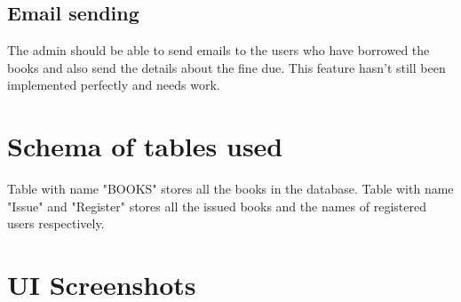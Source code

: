 \documentclass{article}
\begin{document}
\subsection{Email sending}
\large{The admin should be able to send emails to the users who have borrowed the books and also send the details about the fine due. This feature hasn't still been implemented perfectly and needs work.}
\section{Schema of tables used}
\large{Table with name "BOOKS" stores all the books in the database. Table with name "Issue" and "Register" stores all the issued books and the names of registered users respectively.}  

\newpage
\section{UI Screenshots}
\end{document}
